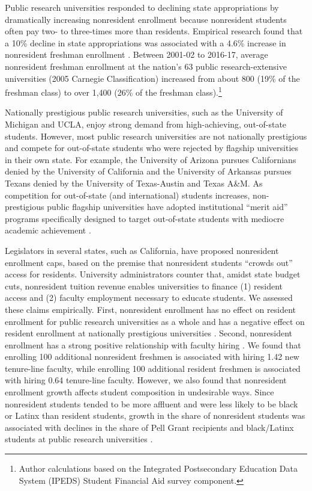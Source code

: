 \documentclass{article}
\begin{document}
Public research universities responded to declining state appropriations by dramatically increasing nonresident enrollment because nonresident students often pay two- to three-times more than residents. Empirical research found that a 10\% decline in state appropriations was associated with a 4.6\% increase in nonresident freshman enrollment \citep{RN3753}. Between 2001-02 to 2016-17, average nonresident freshman enrollment at the nation's 63 public research-extensive universities (2005 Carnegie Classification) increased from about 800 (19\% of the freshman class) to over 1,400 (26\% of the freshman class).\footnote{Author calculations based on the Integrated Postsecondary Education Data System (IPEDS) Student Financial Aid survey component.}

Nationally prestigious public research universities, such as the University of Michigan and UCLA, enjoy strong demand from high-achieving, out-of-state students. However, most public research universities are not nationally prestigious and compete for out-of-state students who were rejected by flagship universities in their own state. For example, the University of Arizona pursues Californians denied by the University of California and the University of Arkansas pursues Texans denied by the University of Texas-Austin and Texas A\&M. As competition for out-of-state (and international) students increases, non-prestigious public flagship universities have adopted institutional ``merit aid'' programs specifically designed to target out-of-state students with mediocre academic achievement \citep{RN4409, RN4032, RN3519, RN3762, RN4494}.

Legislators in several states, such as California, have proposed nonresident enrollment caps, based on the premise that nonresident students ``crowds out'' access for residents. University administrators counter that, amidst state budget cuts, nonresident tuition revenue enables universities to finance (1) resident access and (2) faculty employment necessary to educate students. We assessed these claims empirically. First, nonresident enrollment has no effect on resident enrollment for public research universities as a whole and has a negative effect on resident enrollment at nationally prestigious universities \citep{RN4290}. Second, nonresident enrollment has a strong positive relationship with faculty hiring \citep{RN4492}. We found that enrolling 100 additional nonresident freshmen is associated with hiring 1.42 new tenure-line faculty, while enrolling 100 additional resident freshmen is associated with hiring 0.64 tenure-line faculty. However, we also found that nonresident enrollment growth affects student composition in undesirable ways. Since nonresident students tended to be more affluent and were less likely to be black or Latinx than resident students, growth in the share of nonresident students was associated with declines in the share of Pell Grant recipients and black/Latinx students at public research universities \citep{RN3685}.
\end{document}
